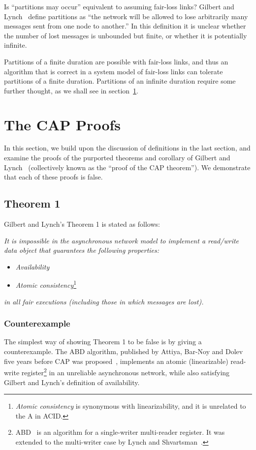 \documentclass[a4paper,twocolumn,10pt]{article}
\begin{document}
Is ``partitions may occur'' equivalent to assuming fair-loss links? Gilbert and
Lynch~\cite{Gilbert2002il} define partitions as ``the network will be allowed to lose arbitrarily
many messages sent from one node to another.'' In this definition it is unclear whether the number
of lost messages is unbounded but finite, or whether it is potentially infinite.

Partitions of a finite duration are possible with fair-loss links, and thus an algorithm that is
correct in a system model of fair-loss links can tolerate partitions of a finite duration.
Partitions of an infinite duration require some further thought, as we shall see in
section~\ref{sec:proofs}.

\section{The CAP Proofs}\label{sec:proofs}

In this section, we build upon the discussion of definitions in the last section, and examine the
proofs of the purported theorems and corollary of Gilbert and Lynch~\cite{Gilbert2002il}
(collectively known as the ``proof of the CAP theorem''). We demonstrate that each of these proofs
is false.

\subsection{Theorem 1}\label{sec:theorem1}

Gilbert and Lynch's Theorem 1 is stated as follows:

\emph{It is impossible in the asynchronous network model to implement a read/write data object that
guarantees the following properties:}
\begin{itemize}
\item \emph{Availability}
\item \emph{Atomic consistency}\footnote{\emph{Atomic consistency} is synonymous with linearizability, and
it is unrelated to the A in ACID.}
\end{itemize}
\emph{in all fair executions (including those in which messages are lost).}

\subsubsection{Counterexample}

The simplest way of showing Theorem 1 to be false is by giving a counterexample. The ABD algorithm,
published by Attiya, Bar-Noy and Dolev five years before CAP was proposed~\cite{Attiya1995bm},
implements an atomic (linearizable) read-write register\footnote{ABD~\cite{Attiya1995bm} is an
algorithm for a single-writer multi-reader register. It was extended to the multi-writer case by
Lynch and Shvartsman~\cite{Lynch1997gr}.} in an unreliable asynchronous network, while also
satisfying Gilbert and Lynch's definition of availability.
\end{document}
